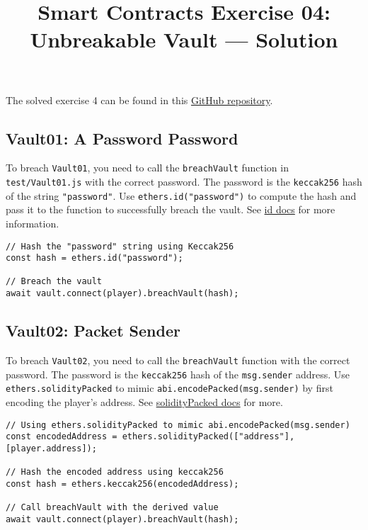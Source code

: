 \documentclass[12pt]{article}
\title{Smart Contracts Exercise 04: \\ Unbreakable Vault --- Solution}
\author{}
\date{}
\begin{document}
\maketitle

\noindent
The solved exercise 4 can be found in this \href{https://github.com/radovluk/Smart-Contract-Exercise/tree/main/04-Unbreakable-Vault/solution/solution-code}{GitHub repository}.

\subsection*{Vault01: A Password Password}

To breach \texttt{Vault01}, you need to call the \texttt{breachVault} function in \texttt{test/Vault01.js} with the correct password. The password is the \texttt{keccak256} hash of the string \texttt{"password"}. Use \texttt{ethers.id("password")} to compute the hash and pass it to the function to successfully breach the vault. See \href{https://docs.ethers.org/v6/api/hashing/\#id}{id docs} for more information.

\noindent
\begin{minipage}{\textwidth}
\begin{verbatim}
// Hash the "password" string using Keccak256
const hash = ethers.id("password");

// Breach the vault
await vault.connect(player).breachVault(hash);
\end{verbatim}
\end{minipage}

\subsection*{Vault02: Packet Sender}

To breach \texttt{Vault02}, you need to call the \texttt{breachVault} function with the correct password. The password is the \texttt{keccak256} hash of the \texttt{msg.sender} address. Use \texttt{ethers.solidityPacked} to mimic \texttt{abi.encodePacked(msg.sender)} by first encoding the player's address. See \href{https://docs.ethers.org/v6/api/hashing/\#solidityPacked}{solidityPacked docs} for more.

\noindent
\begin{minipage}{\textwidth}
\begin{verbatim}
// Using ethers.solidityPacked to mimic abi.encodePacked(msg.sender)
const encodedAddress = ethers.solidityPacked(["address"], [player.address]);

// Hash the encoded address using keccak256
const hash = ethers.keccak256(encodedAddress);

// Call breachVault with the derived value
await vault.connect(player).breachVault(hash);
\end{verbatim}
\end{minipage}
\end{document}
